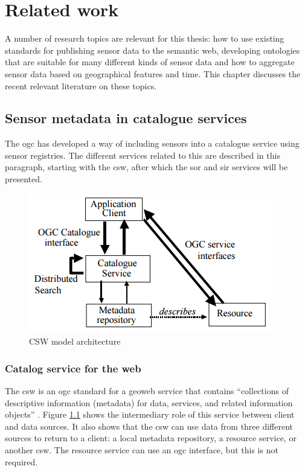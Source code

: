 

\chapter{Related work}
\label{chap:rw}
A number of research topics are relevant for this thesis: how to use existing standards for publishing sensor data to the semantic web, developing ontologies that are suitable for many different kinds of sensor data and how to aggregate sensor data based on geographical features and time. This chapter discusses the recent relevant literature on these topics.  

\section{Sensor metadata in catalogue services}
The \ac{ogc} has developed a way of including sensors into a catalogue service using sensor registries. The different services related to this are described in this paragraph, starting with the \ac{csw}, after which the \acf{sor} and \acf{sir} services will be presented.

\begin{figure}
	\centering
	\includegraphics[width=0.6\linewidth]{UML/CSW.png}
	\caption{CSW model architecture \citep[p. 26]{GEO:OGC2}}
	\label{fig:CSW}
\end{figure}

\subsection{Catalog service for the web}
 The \ac{csw} is an \ac{ogc} standard for a geoweb service that contains \enquote{collections of descriptive information (metadata) for data, services, and related information objects} \citep[p. xiv]{GEO:OGC2}. Figure \ref{fig:CSW} shows the intermediary role of this service between client and data sources. It also shows that the \ac{csw} can use data from three different sources to return to a client: a local metadata repository, a resource service, or another \ac{csw}. The resource service can use an \ac{ogc} interface, but this is not required. 
 
